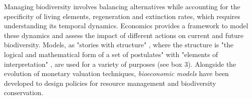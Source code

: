 
Managing biodiversity involves balancing alternatives while accounting for the specificity of living elements, regeneration and extinction rates, which requires understanding its temporal dynamics. Economics provides a framework to model these dynamics and assess the impact of different actions on current and future biodiversity. Models, as "stories with structure" \citep{GibbardVarian}, where the structure is "the logical and mathematical form of a set of postulates" with "elements of interpretation" \citep{GibbardVarian}, are used for a variety of purposes (see box 3).
Alongside the evolution of monetary valuation techniques, \textit{bioeconomic models} have been developed to design policies for resource management and biodiversity conservation.\\


